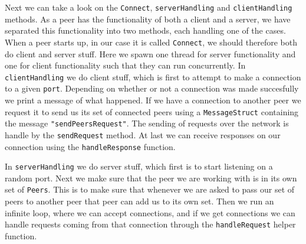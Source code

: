 \documentclass[
  paper=a4,
  ,captions=tableheading
]{scrartcl}
\newcommand{\passthrough}[1]{#1}
\begin{document}
Next we can take a look on the \passthrough{\lstinline!Connect!},
\passthrough{\lstinline!serverHandling!} and
\passthrough{\lstinline!clientHandling!} methods. As a peer has the
functionality of both a client and a server, we have separated this
functionality into two methods, each handling one of the cases. When a
peer starts up, in our case it is called
\passthrough{\lstinline!Connect!}, we should therefore both do client
and server stuff. Here we spawn one thread for server functionality and
one for client functionality such that they can run concurrently. In
\passthrough{\lstinline!clientHandling!} we do client stuff, which is
first to attempt to make a connection to a given
\passthrough{\lstinline!port!}. Depending on whether or not a connection
was made succesfully we print a message of what happened. If we have a
connection to another peer we request it to send us its set of connected
peers using a \passthrough{\lstinline!MessageStruct!} containing the
message \passthrough{\lstinline!"sendPeersRequest"!}. The sending of
requests over the network is handle by the
\passthrough{\lstinline!sendRequest!} method. At last we can receive
responses on our connection using the
\passthrough{\lstinline!handleResponse!} function.

In \passthrough{\lstinline!serverHandling!} we do server stuff, which
first is to start listening on a random port. Next we make sure that the
peer we are working with is in its own set of
\passthrough{\lstinline!Peers!}. This is to make sure that whenever we
are asked to pass our set of peers to another peer that peer can add us
to its own set. Then we run an infinite loop, where we can accept
connections, and if we get connections we can handle requests coming
from that connection through the \passthrough{\lstinline!handleRequest!}
helper function.
\end{document}
